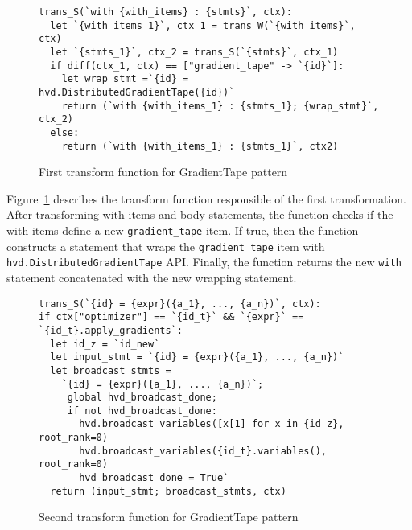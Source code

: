 \begin{figure}[h!]
\begin{lstlisting}[style=mpython]
trans_S(`with {with_items} : {stmts}`, ctx):
  let `{with_items_1}`, ctx_1 = trans_W(`{with_items}`, ctx)
  let `{stmts_1}`, ctx_2 = trans_S(`{stmts}`, ctx_1)
  if diff(ctx_1, ctx) == ["gradient_tape" -> `{id}`]:
    let wrap_stmt =`{id} = hvd.DistributedGradientTape({id})`
    return (`with {with_items_1} : {stmts_1}; {wrap_stmt}`, ctx_2)
  else:
    return (`with {with_items_1} : {stmts_1}`, ctx2)
\end{lstlisting}
\caption{First transform function for GradientTape pattern}
\label{fig:trans:gtapetrans:fn1}
\end{figure}

\begin{inred}
Figure~\ref{fig:trans:gtapetrans:fn1} describes the transform function responsible
of the first transformation.
After transforming with items and body statements,
the function checks if the with items define a new {\tt gradient\_tape} item. 
If true, then the function constructs a statement that wraps the
{\tt gradient\_tape} item with {\tt hvd.DistributedGradientTape} API.
Finally, the function returns the new {\tt with} statement
concatenated with the new wrapping statement.
\end{inred}


\begin{figure}[h!]
\begin{lstlisting}[style=mpython]
trans_S(`{id} = {expr}({a_1}, ..., {a_n})`, ctx):
if ctx["optimizer"] == `{id_t}` && `{expr}` == `{id_t}.apply_gradients`:
  let id_z = `id_new`
  let input_stmt = `{id} = {expr}({a_1}, ..., {a_n})` 
  let broadcast_stmts =
    `{id} = {expr}({a_1}, ..., {a_n})`;
     global hvd_broadcast_done;
     if not hvd_broadcast_done:
       hvd.broadcast_variables([x[1] for x in {id_z}, root_rank=0)
       hvd.broadcast_variables({id_t}.variables(), root_rank=0)
       hvd_broadcast_done = True`
  return (input_stmt; broadcast_stmts, ctx)
\end{lstlisting}
\caption{Second transform function for GradientTape pattern}
\label{fig:trans:gtapetrans:fn2}
\end{figure}

